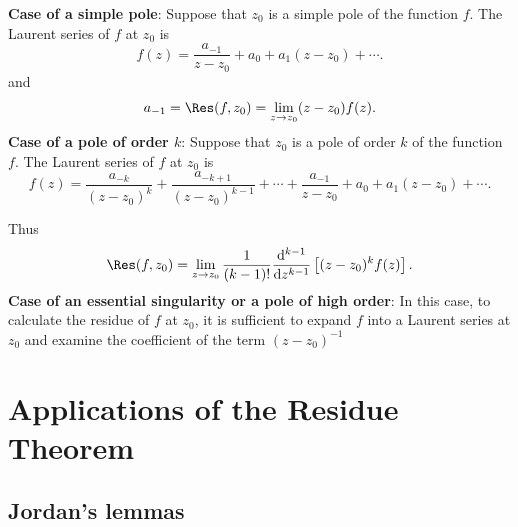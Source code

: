 \documentclass{report}
\begin{document}
\begin{enumerate}
	\ii \textbf{Case of a simple pole}: Suppose that $z_0$ is a simple pole of the function $f$. The Laurent series of $f$ at $z_0$ is
	\[
		f(z) = \frac{a_{-1}}{z-z_0} + a_0 + a_1(z-z_0) + \cdots
		.\]
	and
	\[
		a_{-1} = \Res(f,z_0) = \lim_{z\to z_0} (z-z_0)f(z)
		.\]
	\ii \textbf{Case of a pole of order $k$}: Suppose that $z_0$ is a pole of order $k$ of the function $f$. The Laurent series of $f$ at $z_0$ is
	\[
		f(z) = \frac{a_{-k}}{(z-z_0)^k} + \frac{a_{-k+1}}{(z-z_0)^{k-1}} + \cdots + \frac{a_{-1}}{z-z_0} + a_0 + a_1(z-z_0) + \cdots
		.\]

	Thus
	\[
		\Res(f,z_0) = \lim_{z\to z_0} \frac{1}{(k-1)!} \dv[k-1]{z} \lt[ (z-z_0)^k f(z) \rt]
		.\]
	\ii \textbf{Case of an essential singularity or a pole of high order}: In this case, to calculate the residue of $f$ at $z_0$, it is sufficient to expand $f$ into a Laurent series at $z_0$ and examine the coefficient of the term $(z-z_0)^{-1}$
\end{enumerate}


\section{Applications of the Residue Theorem}

\subsection{Jordan’s lemmas}

\end{document}
